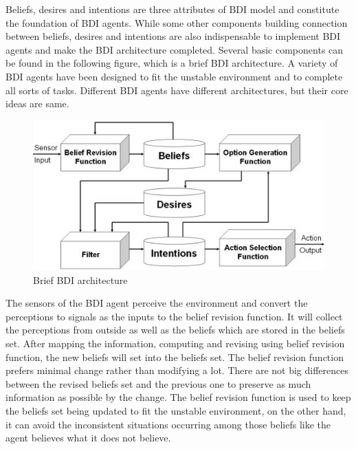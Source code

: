 Beliefs, desires and intentions are three attributes of BDI model and constitute the foundation of BDI agents. While some other components building connection between beliefs, desires and intentions are also indispensable to implement BDI agents and make the BDI architecture completed.
Several basic components can be found in the following figure, which is a brief BDI architecture. A variety of BDI agents have been designed to fit the unstable environment and to complete all sorts of tasks. Different BDI agents have different architectures, but their core ideas are same.

\begin{figure}[htbp]
  \centering
  \includegraphics[width=\textwidth]{images/BDIAr}
  \caption{Brief BDI architecture \cite{BDIA}}%
  \label{fig:Brief BDI architecture}
\end{figure}

The sensors of the BDI agent perceive the environment and convert the perceptions to signals as the inputs to the belief revision function. It will collect the perceptions from outside as well as the beliefs which are stored in the beliefs set. After mapping the information, computing and revising using belief revision function, the new beliefs will set into the beliefs set. The belief revision function prefers minimal change rather than modifying a lot. There are not big differences between the revised beliefs set and the previous one to preserve as much information as possible by the change\cite{Antje_SpatialBelief_2011}. The belief revision function is used to keep the beliefs set being updated to fit the unstable environment, on the other hand, it can avoid the inconsistent situations occurring among those beliefs like the agent believes what it does not believe.


